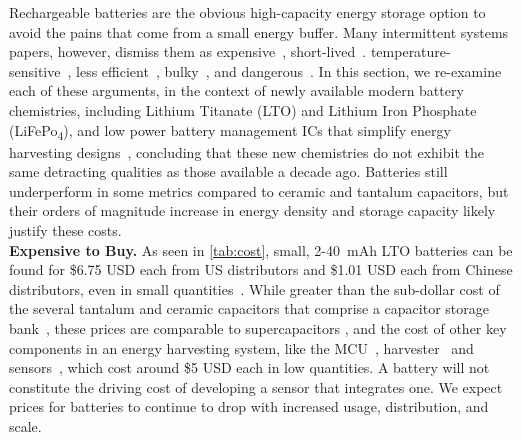 Rechargeable batteries
are the obvious high-capacity energy storage option to avoid the pains
that come from a small energy buffer.
Many intermittent systems papers,
however, dismiss them as
expensive~\cite{hesterNew17, hesterTragedy15, hesterFlicker17, hesterTimely17},
short-lived~\cite{hesterNew17, hesterTragedy15, hesterFlicker17, hesterTimely17, colinReconfigurable18, luciaIntermittent17, yervaGrafting12}.
temperature-sensitive~\cite{hesterNew17, hesterTragedy15, hesterFlicker17, hesterTimely17, colinReconfigurable18, luciaIntermittent17},
less efficient~\cite{hesterNew17, hesterTragedy15, hesterFlicker17, hesterTimely17},
bulky~\cite{hesterNew17, hesterTragedy15, hesterFlicker17, hesterTimely17, yervaGrafting12},
and
dangerous~\cite{hesterNew17, hesterTragedy15, hesterFlicker17, hesterTimely17}.
In this section, we re-examine each of these arguments, in the context of newly
available modern battery chemistries, including Lithium Titanate (LTO) and
Lithium Iron Phosphate (LiFePo\textsubscript{4}), and low power battery management ICs that simplify energy harvesting designs~\cite{bq25505},
concluding that these new chemistries do not exhibit the same detracting
qualities as those available a decade ago. Batteries still
underperform in some metrics compared to ceramic and tantalum
capacitors, but their orders of magnitude increase in energy density and
storage capacity likely justify these costs.\\

\vspace{-6pt}
\noindent
\textbf{Expensive to Buy.}
As seen in \cref{tab:cost}, small, 2-40~mAh LTO batteries can be found for
\$6.75 USD each from US distributors and \$1.01 USD each from Chinese distributors, even in
small quantities~\cite{LTODatasheet, LTODatasheet2}. While greater than the
sub-dollar cost of the several tantalum and ceramic capacitors that comprise a
capacitor storage bank~\cite{ceramicDatasheet, tantalumDatasheet}, these prices
are comparable to supercapacitors \cite{kemetCap, murataCap, seikoCap}, and the
cost of other key components in an energy harvesting system, like the
MCU~\cite{nrf52840}, harvester~\cite{sanyoSolarCell} and sensors~\cite{si7021},
which cost around \$5 USD each in low quantities.  A battery will not constitute
the driving cost of developing a sensor that integrates one. We expect prices
for batteries to continue to drop with increased usage, distribution, and
scale.\\

